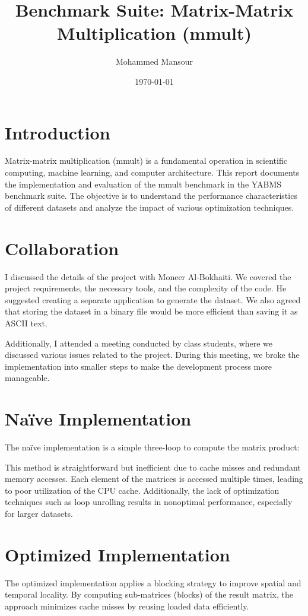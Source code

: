 \documentclass[12pt]{article}
\title{Benchmark Suite: Matrix-Matrix Multiplication (mmult)}
\author{Mohammed Mansour}
\date{\today}
\begin{document}
\maketitle

\section{Introduction}
Matrix-matrix multiplication (mmult) is a fundamental operation in scientific computing, machine learning, and computer architecture. This report documents the implementation and evaluation of the mmult benchmark in the YABMS benchmark suite. The objective is to understand the performance characteristics of different datasets and analyze the impact of various optimization techniques.

\section{Collaboration}
I discussed the details of the project with Moneer Al-Bokhaiti. We covered the project requirements, the necessary tools, and the complexity of the code. He suggested creating a separate application to generate the dataset. We also agreed that storing the dataset in a binary file would be more efficient than saving it as ASCII text.

Additionally, I attended a meeting conducted by class students, where we discussed various issues related to the project. During this meeting, we broke the implementation into smaller steps to make the development process more manageable.

\section{Naïve Implementation}
The naïve implementation is a simple three-loop to compute the matrix product:



This method is straightforward but inefficient due to cache misses and redundant memory accesses. Each element of the matrices is accessed multiple times, leading to poor utilization of the CPU cache. Additionally, the lack of optimization techniques such as loop unrolling results in nonoptimal performance, especially for larger datasets.

\section{Optimized Implementation}
The optimized implementation applies a blocking strategy to improve spatial and temporal locality. By computing sub-matrices (blocks) of the result matrix, the approach minimizes cache misses by reusing loaded data efficiently.
\end{document}
